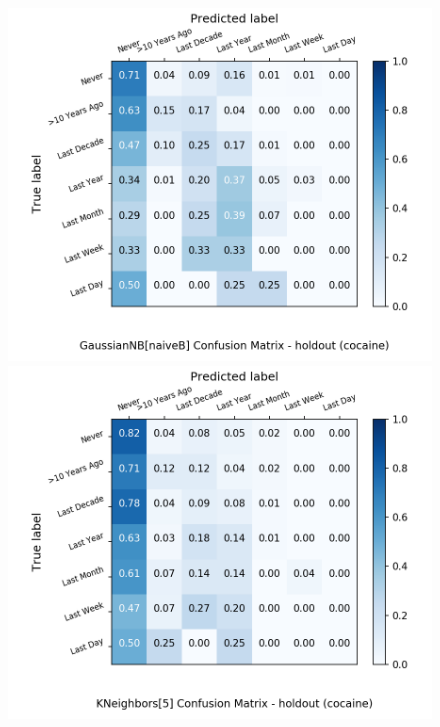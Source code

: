 \begin{figure}[H]
\begin{minipage}[b]{0.32\textwidth}
		\includegraphics[width=1.1\textwidth]{Plots/cocaine_GaussianNB_naiveB_balance_False_holdout.png}
	\end{minipage}
	\begin{minipage}[b]{0.32\textwidth}
		\includegraphics[width=1.1\textwidth]{Plots/cocaine_KNeighbors_5_balance_False_holdout.png}
  \end{minipage}
	\begin{minipage}[b]{0.32\textwidth}

\end{minipage}
\end{figure}

